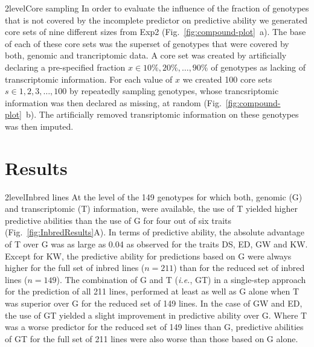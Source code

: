 \documentclass[12pt,titlepage]{article}
\begin{document}
\Genetics2level{Core sampling}
In order to evaluate the influence of the fraction of genotypes that is not
covered by the incomplete predictor on predictive ability we generated core
sets of nine different sizes from Exp2 (Fig.~\ref{fig:compound-plot}~a).
The base of each of these core sets was the superset of genotypes that were
covered by both, genomic and trancriptomic data.
A core set was created by artificially declaring a pre-specified fraction 
$x \in {10\%, 20\%, \dots, 90\%}$ of genotypes as lacking of transcriptomic 
information.
For each value of $x$ we created 100 core sets $s \in {1, 2, 3, \dots, 100}$ by
repeatedly sampling genotypes, whose trancsriptomic information was then 
declared as missing, at random (Fig.~\ref{fig:compound-plot}~b).
The artificially removed transriptomic information on these genotypes was then
imputed.













\section*{Results}
\Genetics2level{Inbred lines}
At the level of the 149 genotypes for which both, genomic (G) and 
transcriptomic (T) information, were available, the use of T yielded higher
predictive abilities than the use of G for four out of six traits
(Fig.~\ref{fig:InbredResults}A).
In terms of predictive ability, the absolute advantage of T over G was as large 
as 0.04 as observed for the traits DS, ED, GW and KW\@.
Except for KW, the predictive ability for predictions based on G were always
higher for the full set of inbred lines ($n = 211$) than for the reduced set of 
inbred lines ($n = 149$).
The combination of G and T (\textit{i.e.}, GT) in a single-step approach for the 
prediction of all 211 lines, performed at least as well as G alone when T was 
superior over G for the reduced set of 149 lines.
In the case of GW and ED, the use of GT yielded a slight improvement in predictive 
ability over G.
Where T was a worse predictor for the reduced set of 149 lines than G,
predictive abilities of GT for the full set of 211 lines were also worse than 
those based on G alone.
\end{document}
